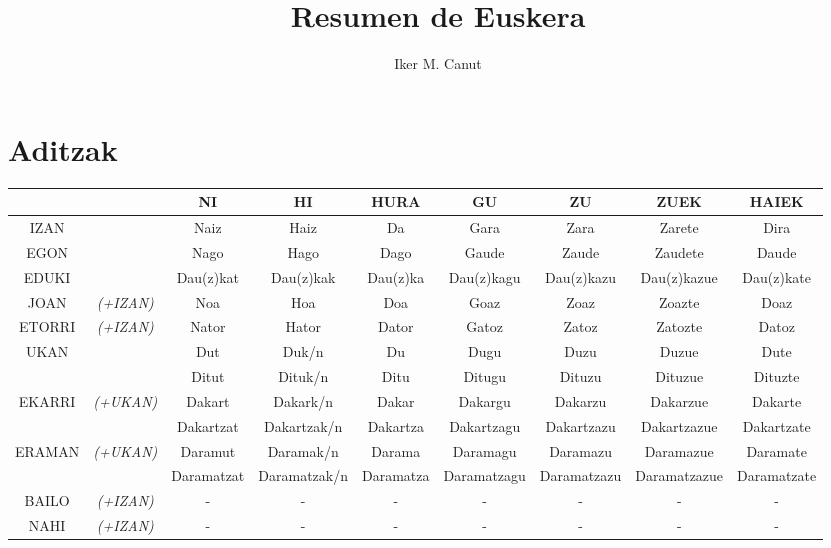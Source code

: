 \documentclass[12pt, a4paper, landscape]{article}
\begin{document}
\author{Iker M. Canut}
\title{Resumen de Euskera}
\maketitle
\newpage

\tableofcontents
\newpage

\section{Aditzak}
\begin{table}[h]
\begin{center}
\begin{tabular}{|cc|c|c|c|c|c|c|c|}
\hline
&& NI & HI & HURA & GU & ZU & ZUEK & HAIEK \\
\hline
IZAN && Naiz & Haiz & Da & Gara & Zara & Zarete & Dira \\
\hline
EGON && Nago & Hago & Dago & Gaude & Zaude & Zaudete & Daude \\
\hline
EDUKI && Dau(z)kat & Dau(z)kak & Dau(z)ka & Dau(z)kagu & Dau(z)kazu & Dau(z)kazue & Dau(z)kate \\
\hline
JOAN & \small{\textit{(+IZAN)}} & Noa & Hoa & Doa & Goaz & Zoaz & Zoazte & Doaz \\
\hline
ETORRI & \small{\textit{(+IZAN)}} & Nator & Hator & Dator & Gatoz & Zatoz & Zatozte & Datoz \\
\hline
\multirow{2}{*}{UKAN} && Dut & Duk/n & Du & Dugu & Duzu & Duzue & Dute \\ && Ditut & Dituk/n & Ditu & Ditugu & Dituzu & Dituzue & Dituzte \\
\hline
\multirow{2}{*}{EKARRI} &\multirow{2}{*}{ \small{\textit{(+UKAN)}} }& Dakart & Dakark/n & Dakar & Dakargu & Dakarzu & Dakarzue & Dakarte \\ && Dakartzat & Dakartzak/n & Dakartza & Dakartzagu & Dakartzazu & Dakartzazue & Dakartzate \\
\hline
\multirow{2}{*}{ERAMAN} &\multirow{2}{*}{ \small{\textit{(+UKAN)}} }& Daramut & Daramak/n & Darama & Daramagu & Daramazu & Daramazue & Daramate \\ && Daramatzat & Daramatzak/n & Daramatza & Daramatzagu & Daramatzazu & Daramatzazue & Daramatzate \\
\hline
BAILO & \small{\textit{(+IZAN)}} & - & - & - & - & - & - & - \\
\hline
NAHI & \small{\textit{(+IZAN)}} & - & - & - & - & - & - & - \\
\hline
\end{tabular}
\end{center}
\end{table}
\newpage
\end{document}
